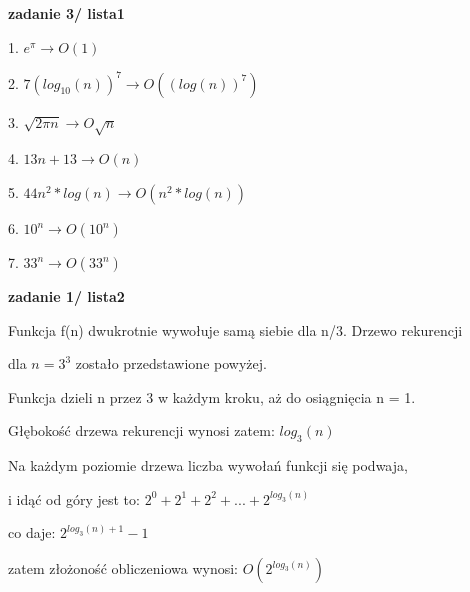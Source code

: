 \documentclass{article}
\begin{document}
\vspace{1\baselineskip}
\textbf{zadanie 3/ lista1} \par
1. $e^{\pi}   \rightarrow O(1)$ \par
2. $7(log_{10}(n))^7  \rightarrow O((log(n))^7)$ \par
3. $\sqrt{2\pi n}  \rightarrow O{\sqrt{n}}$ \par
4. $13n + 13  \rightarrow O(n)$ \par
5. $44n^2 * log(n)  \rightarrow O(n^2 * log(n))$ \par
6. $10^n  \rightarrow O(10^n)$ \par
7. $33^n  \rightarrow O(33^n)$ \par 

\textbf{zadanie 1/ lista2} \par
{}
    \par
    \vspace{1\baselineskip}
    Funkcja f(n) dwukrotnie wywołuje samą siebie dla n/3. Drzewo rekurencji  \par
    dla $n = 3^3$ zostało przedstawione powyżej. \par
    Funkcja dzieli n przez 3 w każdym kroku, aż do osiągnięcia n = 1. \par
    Głębokość drzewa rekurencji wynosi zatem: $log_3(n)$ \par
    Na każdym poziomie drzewa liczba wywołań funkcji się podwaja, \par
    i idąć od góry jest to: $2^0 + 2^1 + 2^2 + ... + 2^{log_3(n)}$ \par
    co daje: $2^{log_3(n) + 1} - 1$ \par
    zatem złożoność obliczeniowa wynosi: $O(2^{log_3(n)})$ \par
\end{document}
